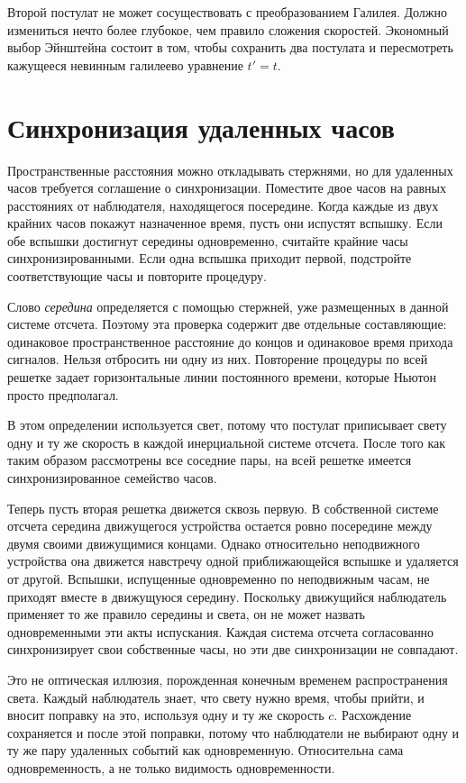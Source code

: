 Второй постулат не может сосуществовать с преобразованием Галилея. Должно измениться нечто более глубокое, чем правило сложения скоростей. Экономный выбор Эйнштейна состоит в том, чтобы сохранить два постулата и пересмотреть кажущееся невинным галилеево уравнение \(t'=t\).

\section{Синхронизация удаленных часов}

Пространственные расстояния можно откладывать стержнями, но для удаленных часов требуется соглашение о синхронизации. Поместите двое часов на равных расстояниях от наблюдателя, находящегося посередине. Когда каждые из двух крайних часов покажут назначенное время, пусть они испустят вспышку. Если обе вспышки достигнут середины одновременно, считайте крайние часы синхронизированными. Если одна вспышка приходит первой, подстройте соответствующие часы и повторите процедуру.

Слово \emph{середина} определяется с помощью стержней, уже размещенных в данной системе отсчета. Поэтому эта проверка содержит две отдельные составляющие: одинаковое пространственное расстояние до концов и одинаковое время прихода сигналов. Нельзя отбросить ни одну из них. Повторение процедуры по всей решетке задает горизонтальные линии постоянного времени, которые Ньютон просто предполагал.

В этом определении используется свет, потому что постулат приписывает свету одну и ту же скорость в каждой инерциальной системе отсчета. После того как таким образом рассмотрены все соседние пары, на всей решетке имеется синхронизированное семейство часов.

Теперь пусть вторая решетка движется сквозь первую. В собственной системе отсчета середина движущегося устройства остается ровно посередине между двумя своими движущимися концами. Однако относительно неподвижного устройства она движется навстречу одной приближающейся вспышке и удаляется от другой. Вспышки, испущенные одновременно по неподвижным часам, не приходят вместе в движущуюся середину. Поскольку движущийся наблюдатель применяет то же правило середины и света, он не может назвать одновременными эти акты испускания. Каждая система отсчета согласованно синхронизирует свои собственные часы, но эти две синхронизации не совпадают.

Это не оптическая иллюзия, порожденная конечным временем распространения света. Каждый наблюдатель знает, что свету нужно время, чтобы прийти, и вносит поправку на это, используя одну и ту же скорость \(c\). Расхождение сохраняется и после этой поправки, потому что наблюдатели не выбирают одну и ту же пару удаленных событий как одновременную. Относительна сама одновременность, а не только видимость одновременности.

